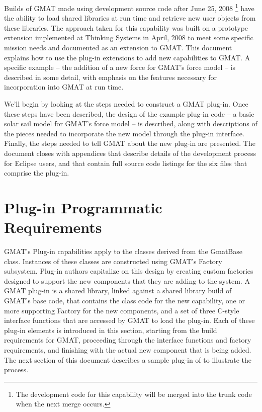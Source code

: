 \documentclass[letterpaper,10pt]{article}
\begin{document}
Builds of GMAT made using development source code after June 25, 2008 \footnote{The development code
for this capability will be merged into the trunk code when the next merge occurs.} have the ability
to load shared libraries at run time and retrieve new user objects from these libraries. The
approach taken for this capability was built on a prototype extension implemented at Thinking
Systems in April, 2008 to meet some specific mission needs and documented as an extension to
GMAT\cite{pluginProp}. This document explains how to use the plug-in extensions to add new
capabilities to GMAT.  A specific example -- the addition of a new force for GMAT's force model --
is described in some detail, with emphasis on the features necessary for incorporation into GMAT at
run time.

We'll begin by looking at the steps needed to construct a GMAT plug-in.  Once these steps have been
described, the design of the example plug-in code -- a basic solar sail model for GMAT's force
model -- is described, along with descriptions of the pieces needed to incorporate the new model
through the plug-in interface.  Finally, the steps needed to tell GMAT about the new plug-in are
presented.  The document closes with appendices that describe details of the development process for
Eclipse users, and that contain full source code listings for the six files that comprise the
plug-in.

\section{Plug-in Programmatic Requirements}

GMAT's Plug-in capabilities apply to the classes derived from the GmatBase class.  Instances of
these classes are constructed using GMAT's Factory subsystem.  Plug-in authors capitalize on this
design by creating custom factories designed to support the new components that they are adding to
the system.  A GMAT plug-in is a shared library, linked against a shared library build of GMAT's
base code, that contains the class code for the new capability, one or more supporting Factory for
the new components, and a set of three C-style interface functions that are accessed by GMAT to
load the plug-in.  Each of these plug-in elements is introduced in this section, starting from the
build requirements for GMAT, proceeding through the interface functions and factory requirements,
and finishing with the actual new component that is being added.  The next section of this document
describes a sample plug-in of to illustrate the process.
\end{document}
